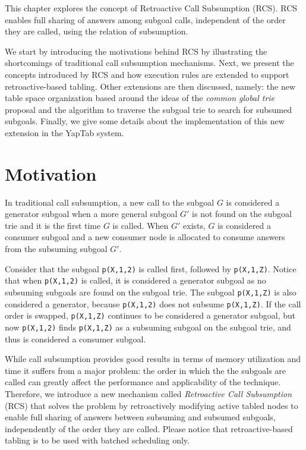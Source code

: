 This chapter explores the concept of Retroactive Call Subsumption (RCS). RCS
enables full sharing of answers among subgoal calls, independent of the order they are called,
using the relation of subsumption.

We start by introducing the motivations behind RCS by illustrating the shortcomings of traditional call
subsumption mechanisms. Next, we present the concepts introduced by RCS and how execution
rules are extended to support retroactive-based tabling. Other extensions are then discussed, namely:
the new table space organization based around the ideas of the \textit{common global trie} proposal
\cite{CostaJ-08} and the algorithm to traverse the subgoal trie to search for subsumed subgoals. Finally, we
give some details about the implementation of this new extension in the YapTab system.

\section{Motivation}

In traditional call subsumption, a new call to the subgoal $G$ is considered a generator subgoal
when a more general subgoal $G'$ is not found on the subgoal trie and it is the first time $G$ is called.
When $G'$ exists, $G$ is considered a consumer subgoal and a new consumer node is allocated to consume
answers from the subsuming subgoal $G'$.

Consider that the subgoal \texttt{p(X,1,2)} is called first, followed by \texttt{p(X,1,Z)}.
Notice that when \texttt{p(X,1,2)} is called, it is considered a generator subgoal as no subsuming subgoals
are found on the subgoal trie. The subgoal \texttt{p(X,1,Z)} is also considered a generator, because
\texttt{p(X,1,2)} does not subsume \texttt{p(X,1,Z)}. If the call order is swapped, \texttt{p(X,1,Z)} continues
to be considered a generator subgoal, but now \texttt{p(X,1,2)} finds \texttt{p(X,1,Z)} as a subsuming subgoal
on the subgoal trie, and thus is considered a consumer subgoal.

While call subsumption provides good results in terms of memory utilization and time it suffers from a
major problem: the order in which the the subgoals are called can greatly affect the performance
and applicability of the technique. Therefore, we introduce a new mechanism called \textit{Retroactive Call
Subsumption} (RCS) that solves the problem by retroactively modifying active tabled nodes to enable full sharing
of answers between subsuming and subsumed subgoals, independently of the order they are called.
Please notice that retroactive-based tabling is to be used with batched scheduling only.

